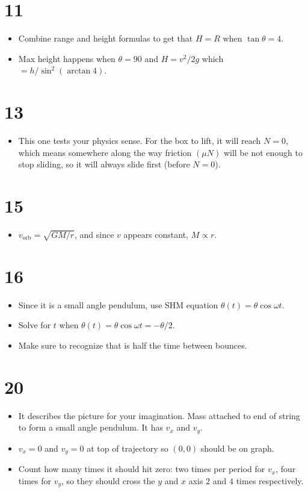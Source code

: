 \documentclass[11pt]{article}
\begin{document}
\section*{11}
\begin{itemize}[leftmargin=*, itemsep=0.25em]
\item Combine range and height formulas to get that $H=R$ when $\tan\theta=4$.
\item Max height happens when $\theta=90$ and $H=v^2/2g$ which $=h/\sin^2(\arctan 4)$.
\end{itemize}

\section*{13}
\begin{itemize}[leftmargin=*, itemsep=0.25em]
\item This one tests your physics sense. For the box to lift, it will reach $N=0$, which means somewhere along the way friction $(\mu N)$ will be not enough to stop sliding, so it will always slide first (before $N=0$).
\end{itemize}

\section*{15}
\begin{itemize}[leftmargin=*, itemsep=0.25em]
\item $v_{\text{orb}}=\sqrt{GM/r}$, and since $v$ appears constant, $M\propto r$.
\end{itemize}

\section*{16}
\begin{itemize}[leftmargin=*, itemsep=0.25em]
\item Since it is a small angle pendulum, use SHM equation $\theta(t)=\theta\cos\omega t$.
\item Solve for $t$ when $\theta(t)=\theta\cos\omega t=-\theta/2$.
\item Make sure to recognize that is half the time between bounces.
\end{itemize}

\section*{20}
\begin{itemize}[leftmargin=*, itemsep=0.25em]
\item It describes the picture for your imagination. Mass attached to end of string to form a small angle pendulum. It has $v_x$ and $v_y$.
\item $v_x=0$ and $v_y=0$ at top of trajectory so $(0,0)$ should be on graph.
\item Count how many times it should hit zero: two times per period for $v_x$, four times for $v_y$, so they should cross the $y$ and $x$ axis $2$ and $4$ times respectively.
\end{itemize}
\end{document}
